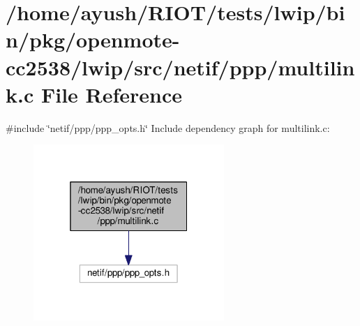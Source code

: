 \hypertarget{openmote-cc2538_2lwip_2src_2netif_2ppp_2multilink_8c}{}\section{/home/ayush/\+R\+I\+O\+T/tests/lwip/bin/pkg/openmote-\/cc2538/lwip/src/netif/ppp/multilink.c File Reference}
\label{openmote-cc2538_2lwip_2src_2netif_2ppp_2multilink_8c}
{\ttfamily \#include \char`\"{}netif/ppp/ppp\+\_\+opts.\+h\char`\"{}}\newline
Include dependency graph for multilink.\+c\+:
\nopagebreak
\begin{figure}[H]
\begin{center}
\leavevmode
\includegraphics[width=205pt]{openmote-cc2538_2lwip_2src_2netif_2ppp_2multilink_8c__incl}
\end{center}
\end{figure}

